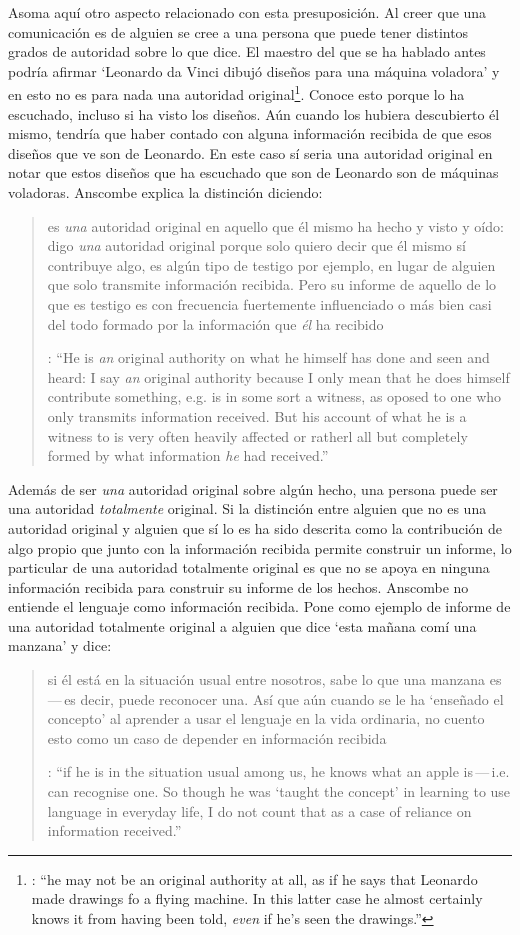 Asoma aquí otro aspecto relacionado con esta presuposición. Al creer que una comunicación es de alguien se cree a una persona que puede tener distintos grados de autoridad sobre lo que dice. El maestro del que se ha hablado antes podría afirmar \enquote*{Leonardo da Vinci dibujó diseños para una máquina voladora} y en esto no es para nada una autoridad original\footnote{\cite[Cf.~][6]{anscombe2008faith:tobelieve}: \enquote{he may not be an original authority at all, as if he says that Leonardo made drawings fo a flying machine. In this latter case he almost certainly knows it from having been told, \emph{even} if he's seen the drawings.}}. Conoce esto porque lo ha escuchado, incluso si ha visto los diseños. Aún cuando los hubiera descubierto él mismo, tendría que haber contado con alguna información recibida de que esos diseños que ve son de Leonardo. En este caso sí seria una autoridad original en notar que estos diseños que ha escuchado que son de Leonardo son de máquinas voladoras. Anscombe explica la distinción diciendo: \blockquote[{\cite[5]{anscombe2008faith:tobelieve}}: \enquote{He is \emph{an} original authority on what he himself has done and seen and heard: I say \emph{an} original authority because I only mean that he does himself contribute something, e.g. is in some sort a witness, as oposed to one who only transmits information received. But his account of what he is a witness to is very often \textelp{} heavily affected or ratherl all but completely formed by what information \emph{he} had received.}]{ es \emph{una} autoridad original en aquello que él mismo ha hecho y visto y oído: digo \emph{una} autoridad original porque solo quiero decir que él mismo sí contribuye algo, es algún tipo de testigo por ejemplo, en lugar de alguien que solo transmite información recibida. Pero su informe de aquello de lo que es testigo es con frecuencia \textelp{} fuertemente influenciado o más bien casi del todo formado por la información que \emph{él} ha recibido} Además de ser \emph{una} autoridad original sobre algún hecho, una persona puede ser una autoridad \emph{totalmente} original. Si la distinción entre alguien que no es una autoridad original y alguien que sí lo es ha sido descrita como la contribución de algo propio que junto con la información recibida permite construir un informe, lo particular de una autoridad totalmente original es que no se apoya en ninguna información recibida para construir su informe de los hechos. Anscombe no entiende el lenguaje como información recibida. Pone como ejemplo de informe de una autoridad totalmente original a alguien que dice \enquote*{esta mañana comí una manzana} y dice: \blockquote[{\cite[6]{anscombe2008faith:tobelieve}}: \enquote{if he is in the situation usual among us, he knows what an apple is\,---\,i.e. can recognise one. So though he was `taught the concept' in learning to use language in everyday life, I do not count that as a case of reliance on information received.}]{si él está en la situación usual entre nosotros, sabe lo que una manzana es\,---\,es decir, puede reconocer una. Así que aún cuando se le ha `enseñado el concepto' al aprender a usar el lenguaje en la vida ordinaria, no cuento esto como un caso de depender en información recibida}.

